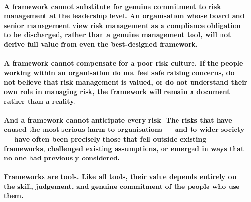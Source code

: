 \paragraph{A framework cannot substitute for genuine commitment to risk management at the leadership level. An organisation whose board and senior management view risk management as a compliance obligation to be discharged, rather than a genuine management tool, will not derive full value from even the best-designed framework.}
\paragraph{A framework cannot compensate for a poor risk culture. If the people working within an organisation do not feel safe raising concerns, do not believe that risk management is valued, or do not understand their own role in managing risk, the framework will remain a document rather than a reality.}
\paragraph{And a framework cannot anticipate every risk. The risks that have caused the most serious harm to organisations — and to wider society — have often been precisely those that fell outside existing frameworks, challenged existing assumptions, or emerged in ways that no one had previously considered.}
\paragraph{Frameworks are tools. Like all tools, their value depends entirely on the skill, judgement, and genuine commitment of the people who use them.}

\newpage
